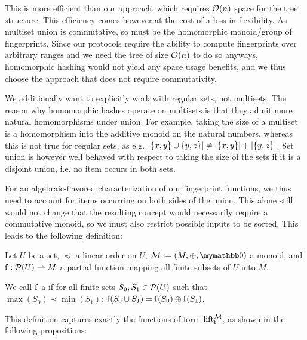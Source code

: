 This is more efficient than our approach, which requires $\mathcal{O}(n)$ space for the tree structure. This efficiency comes however at the cost of a loss in flexibility. As multiset union is commutative, so must be the homomorphic monoid/group of fingerprints. Since our protocols require the ability to compute fingerprints over arbitrary ranges and we need the tree of size $\mathcal{O}(n)$ to do so anyways, homomorphic hashing would not yield any space usage benefits, and we thus choose the approach that does not require commutativity.

We additionally want to explicitly work with regular sets, not multisets. The reason why homomorphic hashes operate on multisets is that they admit more natural homomorphisms under union. For example, taking the size of a multiset is a homomorphism into the additive monoid on the natural numbers, whereas this is not true for regular sets, as e.g. $|{\{x, y\} \cup \{y, z\}}| \neq |{\{x, y\}}| + |{\{y, z\}}|$. Set union is however well behaved with respect to taking the size of the sets if it is a disjoint union, i.e. no item occurs in both sets.

For an algebraic-flavored characterization of our fingerprint functions, we thus need to account for items occurring on both sides of the union. This alone still would not change that the resulting concept would necessarily require a commutative monoid, so we must also restrict possible inputs to be sorted. This leads to the following definition:

\begin{definition}
Let $U$ be a set, $\preceq$ a linear order on $U$, $\mathcal{M} \defeq (M, \groupaddsym, \neutraladd)$ a monoid, and ${\operatorname{f}}: {\mathcal{P}({U})} \rightharpoonup{M}$ a partial function mapping all finite subsets of $U$ into $M$.

We call $\operatorname{f}$ a  if for all finite sets $S_0, S_1 \in \mathcal{P}({U})$ such that $\max(S_0) \prec \min(S_1)$: $\operatorname{f}(S_0 \cup S_1) = {\operatorname{f}(S_0)} \oplus {\operatorname{f}(S_1)}$.
\end{definition}

This definition captures exactly the functions of form $\operatorname{lift_{\operatorname{f}}^{\mathcal{M}}}$, as shown in the following propositions:

